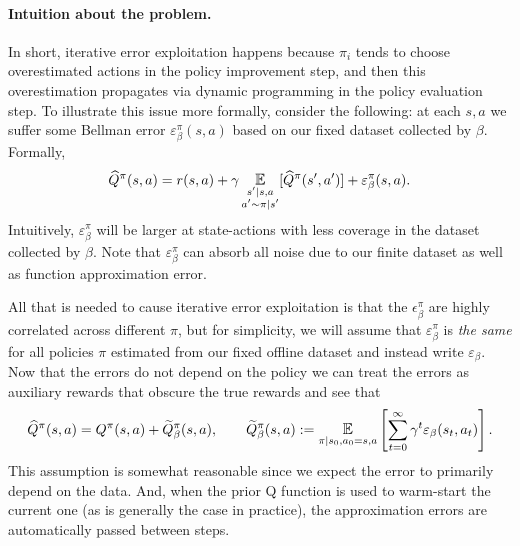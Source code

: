 \paragraph{Intuition about the problem.} In short, iterative error exploitation happens because $ \pi_i$ tends to choose overestimated actions in the policy improvement step, and then this overestimation propagates via dynamic programming in the policy evaluation step. To illustrate this issue more formally, consider the following: at each $ s,a$ we suffer some Bellman error $ \varepsilon_\beta^\pi(s,a)$ based on our fixed dataset collected by $ \beta$. Formally,
\begin{align}
    \widehat Q^\pi(s,a) = r(s,a) + \gamma \E_{\substack{s'|s,a \\ a'\sim \pi|s'}}[\widehat Q^\pi(s',a')] + \varepsilon_\beta^\pi(s,a).
\end{align}
Intuitively, $ \varepsilon_\beta^\pi$ will be larger at state-actions with less coverage in the dataset collected by $ \beta$. Note that $ \varepsilon_\beta^\pi $ can absorb all noise due to our finite dataset as well as function approximation error.

All that is needed to cause iterative error exploitation is that the $ \epsilon_\beta^\pi$ are highly correlated across different $ \pi$, but for simplicity, we will assume that $ \varepsilon_\beta^\pi$ is \emph{the same} for all policies $ \pi$ estimated from our fixed offline dataset and instead write $ \varepsilon_\beta$. Now that the errors do not depend on the policy we can treat the errors as auxiliary rewards that obscure the true rewards and see that
\begin{align}
    \widehat Q^\pi(s,a) = Q^\pi(s,a) + \widetilde Q^\pi_\beta(s,a), \qquad \widetilde Q^\pi_\beta(s,a) := \E_{\pi| s_0, a_0 = s,a }\left[\sum_{t=0}^\infty \gamma^t \varepsilon_\beta(s_t,a_t) \right].
\end{align}
This assumption is somewhat reasonable since we expect the error to primarily depend on the data. And, when the prior Q function is used to warm-start the current one (as is generally the case in practice), the approximation errors are automatically passed between steps.


